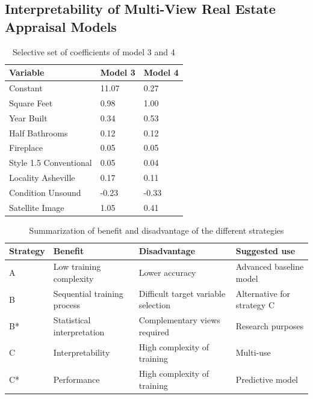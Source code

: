 \documentclass[letterpaper]{article}
\begin{document}
\subsection{Interpretability of Multi-View Real Estate Appraisal Models}

\begin{table}[b]
\centering
\begin{tabular}{|l|l|l|}
\hline
\textbf{Variable} & \textbf{Model 3} & \textbf{Model 4} \\ \hline
Constant & 11.07 & 0.27 \\
Square Feet  & 0.98  & 1.00 \\
Year Built  & 0.34 & 0.53 \\
Half Bathrooms   & 0.12 & 0.12 \\
Fireplace & 0.05 & 0.05 \\
Style 1.5 Conventional & 0.05 & 0.04 \\
Locality Asheville & 0.17 & 0.11 \\
Condition Unsound & -0.23 & -0.33 \\
\hline
Satellite Image  & 1.05 &  0.41 \\
\hline
\end{tabular}
\caption{Selective set of coefficients of model 3 and 4}
\label{tab:coefficients}
\end{table}

\begin{table}[t]
\centering
\begin{adjustbox}{width=1.42\columnwidth}
\begin{tabular}{|l|l|l|l|}
\hline
\textbf{Strategy} & \textbf{Benefit} & \textbf{Disadvantage} & \textbf{Suggested use} \\ \hline
A & Low training complexity & Lower accuracy & Advanced baseline model \\ \hline
B & Sequential training process & Difficult target variable selection & Alternative for strategy C \\ \hline
B* & Statistical interpretation & Complementary views required & Research purposes \\ \hline
C & Interpretability & High complexity of training & Multi-use \\  \hline
C* & Performance & High complexity of training & Predictive model \\
\hline
\end{tabular}
\end{adjustbox}
\caption{Summarization of benefit and disadvantage of the different strategies}
\label{tab:strength}
\end{table}
\end{document}
